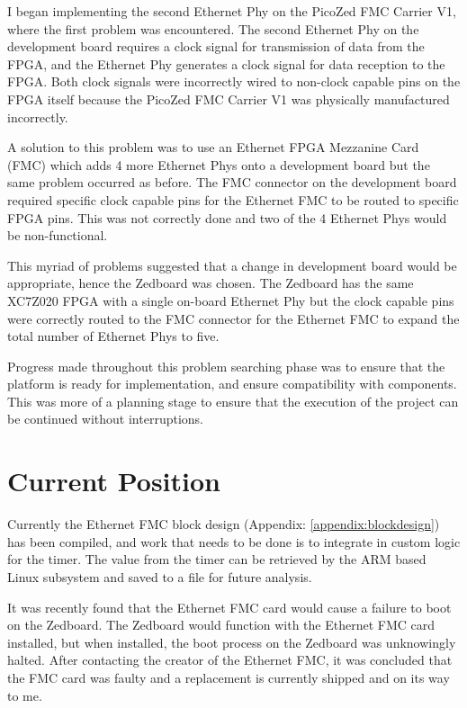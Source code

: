 \par I began implementing the second Ethernet Phy on the PicoZed FMC Carrier V1, where the first
problem was encountered. The second Ethernet Phy on the development board requires a clock
signal for transmission of data from the FPGA, and the Ethernet Phy generates a clock signal for data
reception to the FPGA. Both clock signals were incorrectly wired to non-clock capable pins on the
FPGA itself because the PicoZed FMC Carrier V1 was physically manufactured incorrectly.

\par A solution to this problem was to use an Ethernet FPGA Mezzanine Card (FMC) which adds 4 more
Ethernet Phys onto a development board but the same problem occurred as before. The FMC
connector on the development board required specific clock capable pins for the Ethernet FMC to be
routed to specific FPGA pins. This was not correctly done and two of the 4 Ethernet Phys would be
non-functional.

\par This myriad of problems suggested that a change in development board would be appropriate,
hence the Zedboard was chosen. The Zedboard has the same XC7Z020 FPGA with a single on-board
Ethernet Phy but the clock capable pins were correctly routed to the FMC connector for the Ethernet
FMC to expand the total number of Ethernet Phys to five.

\par Progress made throughout this problem searching phase was to ensure that the platform is ready for implementation, and ensure compatibility with components. This was more of a planning stage to ensure that the execution of the project can be continued without interruptions.

\section{Current Position}

\par Currently the Ethernet FMC block design (Appendix: \ref{appendix:blockdesign}) has been compiled, and work that needs to be done is to integrate in custom logic for the timer. The value from the timer can be retrieved by the ARM based Linux subsystem and saved to a file for future analysis. 

\par It was recently found that the Ethernet FMC card would cause a failure to boot on the Zedboard. The
Zedboard would function with the Ethernet FMC card installed, but when installed, the boot process
on the Zedboard was unknowingly halted. After contacting the creator of the Ethernet FMC, it was
concluded that the FMC card was faulty and a replacement is currently shipped and on its way to me.

